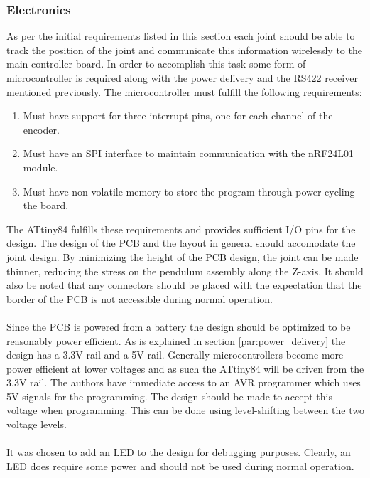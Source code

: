 \subsubsection{Electronics} %
\label{ssub:electronics}
As per the initial requirements listed in this section each joint should be able to track the position of the joint and communicate this information wirelessly to the main controller board.
In order to accomplish this task some form of microcontroller is required along with the power delivery and the RS422 receiver mentioned previously.
The microcontroller must fulfill the following requirements:
\begin{enumerate}
 	\item Must have support for three interrupt pins, one for each channel of the encoder.
 	\item Must have an SPI interface to maintain communication with the nRF24L01 module.
 	\item Must have non-volatile memory to store the program through power cycling the board.
\end{enumerate}
The ATtiny84 \cite{attiny84} fulfills these requirements and provides sufficient I/O pins for the design.
The design of the PCB and the layout in general should accomodate the joint design.
By minimizing the height of the PCB design, the joint can be made thinner, reducing the stress on the pendulum assembly along the Z-axis.
It should also be noted that any connectors should be placed with the expectation that the border of the PCB is not accessible during normal operation.
\\~\\
Since the PCB is powered from a battery the design should be optimized to be reasonably power efficient.
As is explained in section \ref{par:power_delivery} the design has a 3.3V rail and a 5V rail.
Generally microcontrollers become more power efficient at lower voltages and as such the ATtiny84 will be driven from the 3.3V rail.
The authors have immediate access to an AVR programmer which uses 5V signals for the programming.
The design should be made to accept this voltage when programming.
This can be done using level-shifting between the two voltage levels.
\\~\\
It was chosen to add an LED to the design for debugging purposes.
Clearly, an LED does require some power and should not be used during normal operation.
